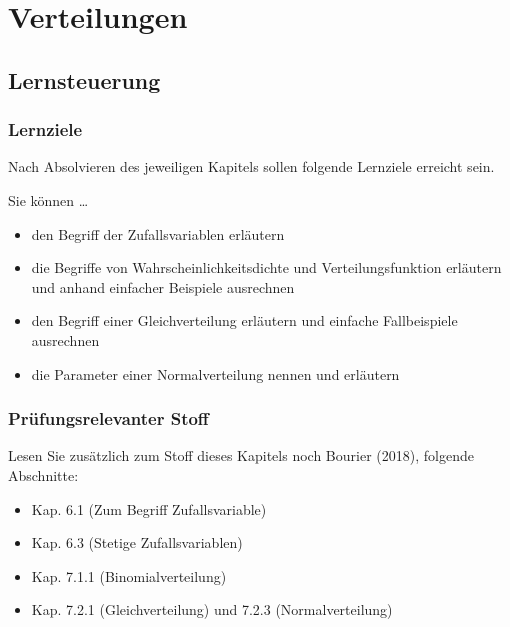 \documentclass[
  a4paper,
  DIV=11]{scrreprt}
\providecommand{\tightlist}{%
  \setlength{\itemsep}{0pt}\setlength{\parskip}{0pt}}\usepackage{longtable,booktabs,array}
\theoremstyle{definition}
\theoremstyle{remark}
\begin{document}

\hypertarget{verteilungen}{%
\chapter{Verteilungen}\label{verteilungen}}

\hypertarget{lernsteuerung-2}{%
\section{Lernsteuerung}\label{lernsteuerung-2}}

\hypertarget{lernziele-3}{%
\subsection{Lernziele}\label{lernziele-3}}

Nach Absolvieren des jeweiligen Kapitels sollen folgende Lernziele
erreicht sein.

Sie können \ldots{}

\begin{itemize}
\tightlist
\item
  den Begriff der Zufallsvariablen erläutern
\item
  die Begriffe von Wahrscheinlichkeitsdichte und Verteilungsfunktion
  erläutern und anhand einfacher Beispiele ausrechnen
\item
  den Begriff einer Gleichverteilung erläutern und einfache
  Fallbeispiele ausrechnen
\item
  die Parameter einer Normalverteilung nennen und erläutern
\end{itemize}

\hypertarget{pruxfcfungsrelevanter-stoff-1}{%
\subsection{Prüfungsrelevanter
Stoff}\label{pruxfcfungsrelevanter-stoff-1}}

Lesen Sie zusätzlich zum Stoff dieses Kapitels noch Bourier (2018),
folgende Abschnitte:

\begin{itemize}
\tightlist
\item
  Kap. 6.1 (Zum Begriff Zufallsvariable)
\item
  Kap. 6.3 (Stetige Zufallsvariablen)
\item
  Kap. 7.1.1 (Binomialverteilung)
\item
  Kap. 7.2.1 (Gleichverteilung) und 7.2.3 (Normalverteilung)
\end{itemize}
\end{document}

